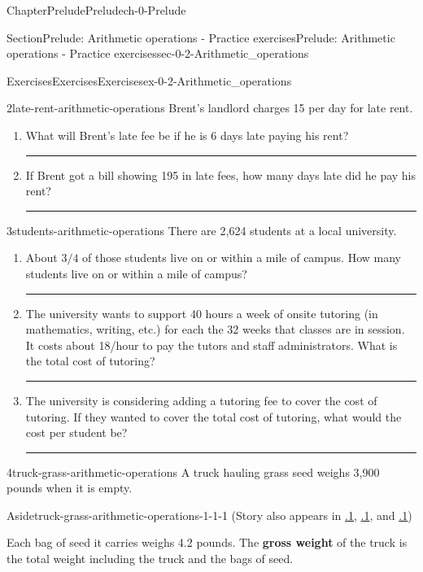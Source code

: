 \documentclass[twoside,11pt,]{book}
\newcommand{\xreffont}{\relax}
\newcommand{\terminology}[1]{\textbf{#1}}
\newlength{\workspacestrutwidth}
\numberwithin{equation}{section}
\newcommand{\sfrac}[2]{{#1}/{#2}}
\begin{document}
\begin{chapterptx}{Chapter}{Prelude}{}{Prelude}{}{}{ch-0-Prelude}
\begin{sectionptx}{Section}{Prelude: Arithmetic operations - Practice exercises}{}{Prelude: Arithmetic operations - Practice exercises}{}{}{sec-0-2-Arithmetic_operations}
\begin{exercises-subsection-numberless}{Exercises}{Exercises}{}{Exercises}{}{}{ex-0-2-Arithmetic_operations}
\begin{divisionexercise}{2}{}{}{late-rent-arithmetic-operations}
Brent's landlord charges \textdollar{}15 per day for late rent.%
\begin{enumerate}[label=(\alph*),ref=\alph*]%
\item{}What will Brent's late fee be if he is 6 days late paying his rent?%
\par\rule{\workspacestrutwidth}{1.5in}%
\item{}If Brent got a bill showing \textdollar{}195 in late fees, how many days late did he pay his rent?%
\par\rule{\workspacestrutwidth}{1.5in}%
\end{enumerate}%
\end{divisionexercise}%
\clearpage
\begin{divisionexercise}{3}{}{}{students-arithmetic-operations}%
There are 2,624 students at a local university.%
\begin{enumerate}[label=(\alph*),ref=\alph*]%
\item{}About \(\sfrac{3}{4}\) of those students live on or within a mile of campus. How many students live on or within a mile of campus?%
\par\rule{\workspacestrutwidth}{0.35in}%
\item{}The university wants to support 40 hours a week of onsite tutoring (in mathematics, writing, etc.) for each the 32 weeks that classes are in session. It costs about \textdollar{}18\slash{}hour to pay the tutors and staff administrators. What is the total cost of tutoring?%
\par\rule{\workspacestrutwidth}{0.35in}%
\item{}The university is considering adding a tutoring fee to cover the cost of tutoring. If they wanted to cover the total cost of tutoring, what would the cost per student be?%
\par\rule{\workspacestrutwidth}{0.35in}%
\end{enumerate}%
\end{divisionexercise}%
 \begin{divisionexercise}{4}{}{}{truck-grass-arithmetic-operations}%
A truck hauling grass seed weighs 3,900 pounds when it is empty. \begin{aside}{Aside}{}{truck-grass-arithmetic-operations-1-1-1}%
(Story also appears in \hyperlink{truck-grass-first-look-linear}{{\xreffont 2.1.1}}, \hyperlink{truck-grass-solving-linear}{{\xreffont 3.1.1}}, and \hyperlink{truck-grass-linear-ineq}{{\xreffont 3.2.1}})%
\end{aside}
 Each bag of seed it carries weighs 4.2 pounds. The \terminology{gross weight} of the truck is the total weight including the truck and the bags of seed.%

\end{divisionexercise}
\end{exercises-subsection-numberless}
\end{sectionptx}
\end{chapterptx}
\end{document}
